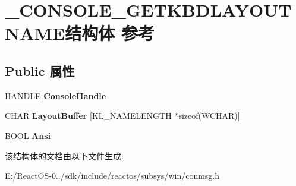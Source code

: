 \hypertarget{struct___c_o_n_s_o_l_e___g_e_t_k_b_d_l_a_y_o_u_t_n_a_m_e}{}\section{\+\_\+\+C\+O\+N\+S\+O\+L\+E\+\_\+\+G\+E\+T\+K\+B\+D\+L\+A\+Y\+O\+U\+T\+N\+A\+M\+E结构体 参考}
\label{struct___c_o_n_s_o_l_e___g_e_t_k_b_d_l_a_y_o_u_t_n_a_m_e}
\subsection*{Public 属性}
\begin{DoxyCompactItemize}
\item 
\mbox{\label{struct___c_o_n_s_o_l_e___g_e_t_k_b_d_l_a_y_o_u_t_n_a_m_e_afa84ed71d5bbeae1767f49e8d060ddfc}} 
\hyperlink{interfacevoid}{H\+A\+N\+D\+LE} {\bfseries Console\+Handle}
\item 
\mbox{\label{struct___c_o_n_s_o_l_e___g_e_t_k_b_d_l_a_y_o_u_t_n_a_m_e_ae5e3c74f471cd1a2ffb6e44a4b8ee694}} 
C\+H\+AR {\bfseries Layout\+Buffer} \mbox{[}K\+L\+\_\+\+N\+A\+M\+E\+L\+E\+N\+G\+TH $\ast$sizeof(W\+C\+H\+AR)\mbox{]}
\item 
\mbox{\label{struct___c_o_n_s_o_l_e___g_e_t_k_b_d_l_a_y_o_u_t_n_a_m_e_a4cf98acb431465a861ec16e2134eec4e}} 
B\+O\+OL {\bfseries Ansi}
\end{DoxyCompactItemize}


该结构体的文档由以下文件生成\+:\begin{DoxyCompactItemize}
\item 
E\+:/\+React\+O\+S-\/0../sdk/include/reactos/subsys/win/conmsg.\+h\end{DoxyCompactItemize}
